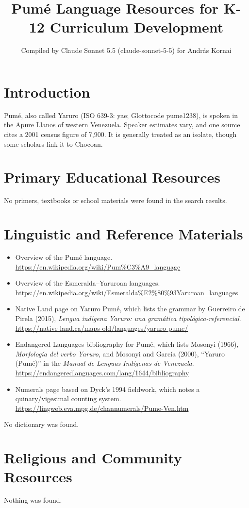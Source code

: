 \documentclass[12pt]{article}
\title{Pum\'e Language Resources for K-12 Curriculum Development}
\author{Compiled by Claude Sonnet 5.5 (claude-sonnet-5-5) for Andr\'as Kornai}
\date{}
\begin{document}
\maketitle

\section{Introduction}
Pum\'e, also called Yaruro (ISO 639-3: yae; Glottocode pume1238), is spoken in the Apure Llanos of western Venezuela. Speaker estimates vary, and one source cites a 2001 census figure of 7,900. It is generally treated as an isolate, though some scholars link it to Chocoan.

\section{Primary Educational Resources}
No primers, textbooks or school materials were found in the search results.

\section{Linguistic and Reference Materials}
\begin{itemize}
\item Overview of the Pum\'e language. \url{https://en.wikipedia.org/wiki/Pum%C3%A9_language}
\item Overview of the Esmeralda--Yaruroan languages. \url{https://en.wikipedia.org/wiki/Esmeralda%E2%80%93Yaruroan_languages}
\item Native Land page on Yaruro Pum\'e, which lists the grammar by Guerreiro de Pirela (2015), \textit{Lengua ind\'igena Yaruro: una gram\'atica tipol\'ogica-referencial}. \url{https://native-land.ca/maps-old/languages/yaruro-pume/}
\item Endangered Languages bibliography for Pum\'e, which lists Mosonyi (1966), \textit{Morfolog\'ia del verbo Yaruro}, and Mosonyi and Garc\'ia (2000), ``Yaruro (Pum\'e)'' in the \textit{Manual de Lenguas Ind\'igenas de Venezuela}. \url{https://endangeredlanguages.com/lang/1644/bibliography}
\item Numerals page based on Dyck's 1994 fieldwork, which notes a quinary/vigesimal counting system. \url{https://lingweb.eva.mpg.de/channumerals/Pume-Ven.htm}
\end{itemize}
No dictionary was found.

\section{Religious and Community Resources}
Nothing was found.
\end{document}

